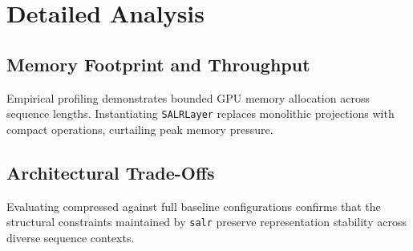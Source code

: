 \section{Detailed Analysis}

\subsection{Memory Footprint and Throughput}
Empirical profiling demonstrates bounded GPU memory allocation across sequence lengths. Instantiating \texttt{SALRLayer} replaces monolithic projections with compact operations, curtailing peak memory pressure.

\subsection{Architectural Trade-Offs}
Evaluating compressed against full baseline configurations confirms that the structural constraints maintained by \texttt{salr} preserve representation stability across diverse sequence contexts.
